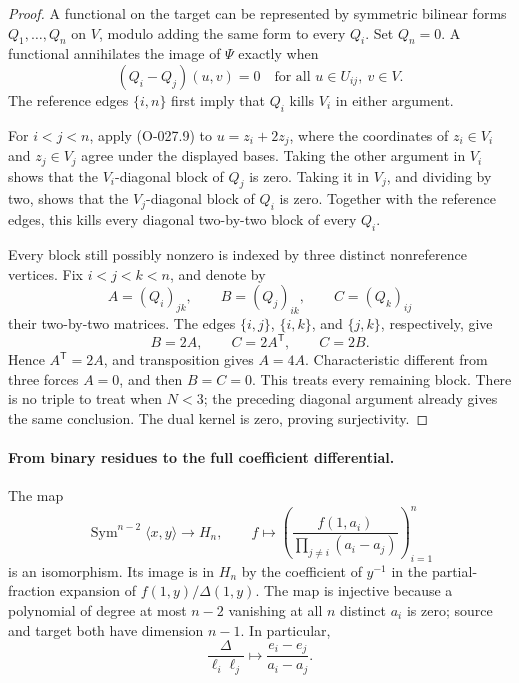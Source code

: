 \begin{proof}
A functional on the target can be represented by symmetric bilinear
forms \(Q_1,\ldots,Q_n\) on \(V\), modulo adding the same form to every
\(Q_i\). Set \(Q_n=0\). A functional annihilates the image of \(\Psi\)
exactly when
\[
             (Q_i-Q_j)(u,v)=0
       \quad\text{for all }u\in U_{ij},\ v\in V.
                                                               \tag{O-027.9}
\]
The reference edges \(\{i,n\}\) first imply that \(Q_i\) kills \(V_i\)
in either argument.

For \(i<j<n\), apply (O-027.9) to
\(u=z_i+2z_j\), where the coordinates of \(z_i\in V_i\) and
\(z_j\in V_j\) agree under the displayed bases.
Taking the other argument in \(V_i\) shows that the
\(V_i\)-diagonal block of \(Q_j\) is zero.
Taking it in \(V_j\), and dividing by two, shows that the
\(V_j\)-diagonal block of \(Q_i\) is zero.
Together with the reference edges, this kills every diagonal
two-by-two block of every \(Q_i\).

Every block still possibly nonzero is indexed by three distinct
nonreference vertices. Fix \(i<j<k<n\), and denote by
\[
            A=(Q_i)_{jk},\qquad B=(Q_j)_{ik},\qquad C=(Q_k)_{ij}
\]
their two-by-two matrices. The edges \(\{i,j\}\), \(\{i,k\}\),
and \(\{j,k\}\), respectively, give
\[
                         B=2A,\qquad C=2A^{\mathsf T},
                         \qquad C=2B.
                                                               \tag{O-027.10}
\]
Hence \(A^{\mathsf T}=2A\), and transposition gives \(A=4A\).
Characteristic different from three forces \(A=0\), and then
\(B=C=0\). This treats every remaining block.
There is no triple to treat when \(N<3\); the preceding diagonal
argument already gives the same conclusion.
The dual kernel is zero, proving surjectivity.
\end{proof}

\paragraph{From binary residues to the full coefficient differential.}
The map
\[
 \operatorname{Sym}^{n-2}\langle x,y\rangle\longrightarrow H_n,
 \qquad
 f\longmapsto
 \left(\frac{f(1,a_i)}{\prod_{j\ne i}(a_i-a_j)}\right)_{i=1}^n
                                                               \tag{O-027.11}
\]
is an isomorphism. Its image is in \(H_n\) by the coefficient
of \(y^{-1}\) in the partial-fraction expansion of
\(f(1,y)/\Delta(1,y)\). The map is injective because a polynomial
of degree at most \(n-2\) vanishing at all \(n\) distinct \(a_i\)
is zero; source and target both have dimension \(n-1\).
In particular,
\[
 \frac{\Delta}{\ell_i\ell_j}\longmapsto
                    \frac{e_i-e_j}{a_i-a_j}.
                                                               \tag{O-027.12}
\]

